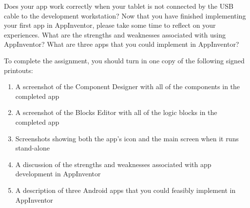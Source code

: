 Does your app work correctly when your tablet is not connected by the USB cable to the development workstation? Now that
you have finished implementing your first app in AppInventor, please take some time to reflect on your experiences.
What are the strengths and weaknesses associated with using AppInventor? What are three apps that you could
implement in AppInventor?


\vspace*{.05in}
\noindent
To complete the assignment, you should turn in one copy of the following signed printouts: 
\vspace*{-.075in}

\begin{enumerate}
	\itemsep0em
	\item A screenshot of the Component Designer with all of the components in the completed app
	\item A screenshot of the Blocks Editor with all of the logic blocks in the completed app 
	\item Screenshots showing both the app's icon and the main screen when it runs stand-alone
	\item A discussion of the strengths and weaknesses associated with app development in AppInventor
	\item A description of three Android apps that you could feasibly implement in AppInventor
\end{enumerate}

% 
% 		
% 
% 
% 
% 
% 

